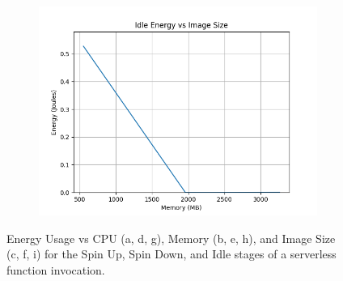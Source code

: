 \documentclass[times, 10pt,twocolumn]{article}
\begin{document}
\begin{figure}[ht]
\begin{subfigure}[b]{0.3\textwidth}
      \includegraphics[width=\textwidth]{imgs/container_study/idle_vs_img.png}
     \caption{}
     \label{fig:idle_img}
   \end{subfigure}
   
   \caption{Energy Usage vs CPU (a, d, g), Memory (b, e, h), and Image Size (c, f, i) for the Spin Up, Spin Down, and Idle stages of a serverless function invocation.}
   \label{fig:energy_stages}
 \end{figure}
\end{document}
